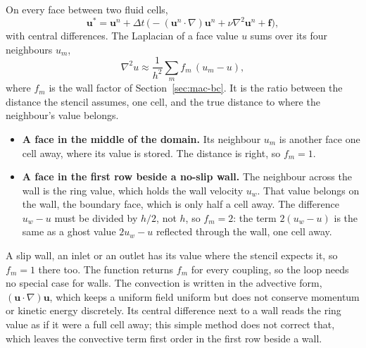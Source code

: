 \documentclass[10pt,a4paper]{article}
\newcommand{\code}[1]{\texttt{\detokenize{#1}}}
\begin{document}
On every face between two fluid cells,
\begin{equation*}
  \mathbf u^* = \mathbf u^n + \Delta t\,\bigl(-(\mathbf u^n\cdot\nabla)\mathbf u^n + \nu\nabla^2\mathbf u^n
   + \mathbf f\bigr),
\end{equation*}
with central differences. The Laplacian of a face value $u$ sums over its four neighbours $u_m$,
\begin{equation*}
  \nabla^2 u \approx \frac{1}{h^2}\sum_{m} f_m\,(u_m - u),
\end{equation*}
where $f_m$ is the wall factor of Section~\ref{sec:mac-bc}. It is the ratio between the distance the stencil assumes,
one cell, and the true distance to where the neighbour's value belongs.
\begin{itemize}[itemsep=1pt,topsep=2pt]
\item \textbf{A face in the middle of the domain.} Its neighbour $u_m$ is another face one cell away, where its
  value is stored. The distance is right, so $f_m = 1$.
\item \textbf{A face in the first row beside a no-slip wall.} The neighbour across the wall is the ring value, which
  holds the wall velocity $u_w$. That value belongs on the wall, the boundary face, which is only half a cell away. The
  difference $u_w - u$ must be divided by $h/2$, not $h$, so $f_m = 2$: the term $2(u_w - u)$ is the same as a ghost
  value $2u_w - u$ reflected through the wall, one cell away.
\end{itemize}
A slip wall, an inlet or an outlet has its value where the stencil expects it, so $f_m = 1$ there too. The function
\code{MAC::WallLinkFactor} returns $f_m$ for every coupling, so the loop needs no special case for walls. The convection is
written in the advective form, $(\mathbf u\cdot\nabla)\mathbf u$, which keeps a uniform field uniform but does not
conserve momentum or kinetic energy discretely. Its central difference next to a wall reads the ring value as if it
were a full cell away; this simple method does not correct that, which leaves the convective term first order in the
first row beside a wall.
\end{document}
